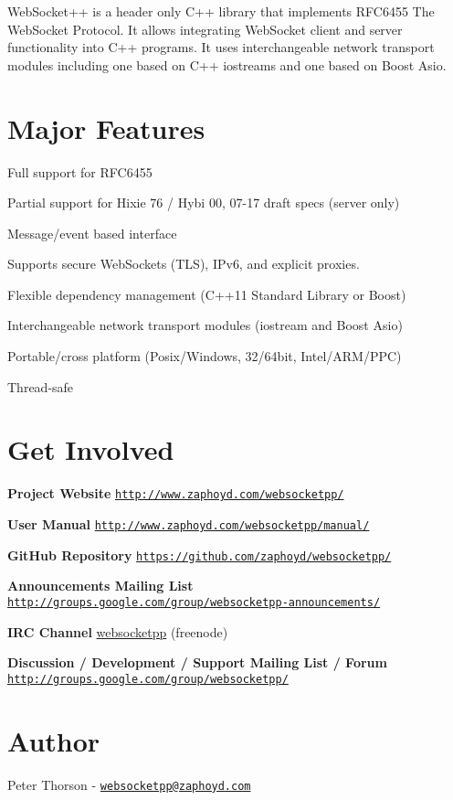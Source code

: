 Web\+Socket++ is a header only C++ library that implements R\+F\+C6455 The Web\+Socket Protocol. It allows integrating Web\+Socket client and server functionality into C++ programs. It uses interchangeable network transport modules including one based on C++ iostreams and one based on Boost Asio.

\section*{Major Features }


\begin{DoxyItemize}
\item Full support for R\+F\+C6455
\item Partial support for Hixie 76 / Hybi 00, 07-\/17 draft specs (server only)
\item Message/event based interface
\item Supports secure Web\+Sockets (T\+LS), I\+Pv6, and explicit proxies.
\item Flexible dependency management (C++11 Standard Library or Boost)
\item Interchangeable network transport modules (iostream and Boost Asio)
\item Portable/cross platform (Posix/\+Windows, 32/64bit, Intel/\+A\+R\+M/\+P\+PC)
\item Thread-\/safe
\end{DoxyItemize}

\section*{Get Involved }

\href{https://travis-ci.org/zaphoyd/websocketpp}{\tt }

{\bfseries Project Website} \href{http://www.zaphoyd.com/websocketpp/}{\tt http\+://www.\+zaphoyd.\+com/websocketpp/}

{\bfseries User Manual} \href{http://www.zaphoyd.com/websocketpp/manual/}{\tt http\+://www.\+zaphoyd.\+com/websocketpp/manual/}

{\bfseries Git\+Hub Repository} \href{https://github.com/zaphoyd/websocketpp/}{\tt https\+://github.\+com/zaphoyd/websocketpp/}

{\bfseries Announcements Mailing List} \href{http://groups.google.com/group/websocketpp-announcements/}{\tt http\+://groups.\+google.\+com/group/websocketpp-\/announcements/}

{\bfseries I\+RC Channel} \hyperlink{namespacewebsocketpp}{websocketpp} (freenode)

{\bfseries Discussion / Development / Support Mailing List / Forum} \href{http://groups.google.com/group/websocketpp/}{\tt http\+://groups.\+google.\+com/group/websocketpp/}

\section*{Author }

Peter Thorson -\/ \href{mailto:websocketpp@zaphoyd.com}{\tt websocketpp@zaphoyd.\+com} 